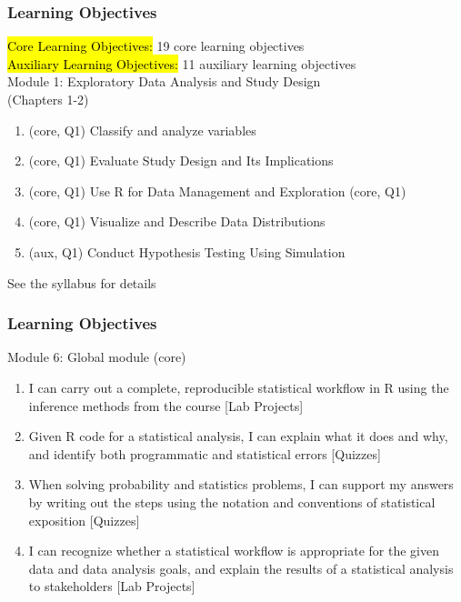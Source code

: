 \documentclass[slidestop,compress,mathserif]{beamer}
\begin{document}

\begin{frame}
	\frametitle{Learning Objectives}

	\hl{Core Learning Objectives:} 19 core learning objectives \\
	\hl{Auxiliary Learning Objectives:} 11 auxiliary learning objectives \\

	\vspace{10pt}
	Module 1: Exploratory Data Analysis and Study Design \\(Chapters 1-2)
	\begin{enumerate}
		\item (core, Q1) Classify and analyze variables 
		\item (core, Q1) Evaluate Study Design and Its Implications 
		\item (core, Q1) Use R for Data Management and Exploration (core, Q1)
		\item (core, Q1) Visualize and Describe Data Distributions 
		\item (aux, Q1) Conduct Hypothesis Testing Using Simulation 
	\end{enumerate}
	See the syllabus for details
\end{frame}

\begin{frame}
	\frametitle{Learning Objectives}
	Module 6: Global module (core)
	\begin{enumerate}
		\item I can carry out a complete, reproducible statistical workflow in R using the inference methods from the course [Lab Projects] 
		\item Given R code for a statistical analysis, I can explain what it does and why, and identify both programmatic and statistical errors [Quizzes] 
		\item When solving probability and statistics problems, I can support my answers by writing out the steps using the notation and conventions of statistical exposition [Quizzes] 
		\item I can recognize whether a statistical workflow is appropriate for the given data and data analysis goals, and explain the results of a statistical analysis to stakeholders [Lab Projects]
	\end{enumerate}
\end{frame}

\end{document}
